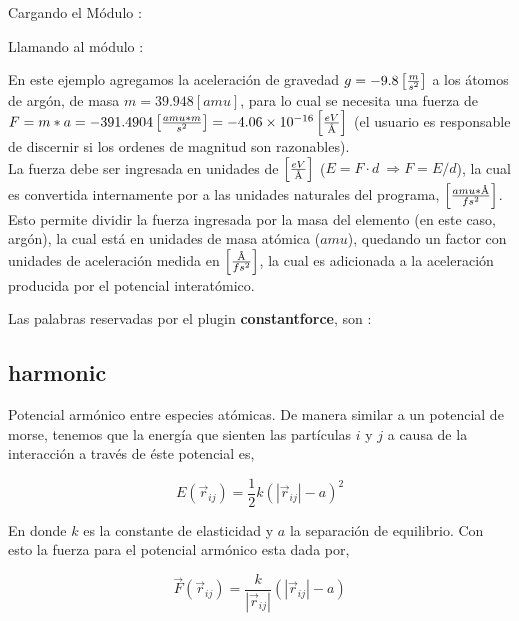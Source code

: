 Cargando el M\'odulo :

Llamando al m\'odulo :


En este ejemplo agregamos la aceleraci\'on de gravedad $g=-9.8\left[m\over s^2\right]$ a los \'atomos de arg\'on, de masa $m=39.948 [amu]$, para lo cual se necesita una fuerza de $F=m*a=-391.4904 \left[amu*m\over s^2\right]=-4.06\times10^{-16}\left[eV\over \text\AA\right]$ (el usuario es responsable de discernir si los ordenes de magnitud son razonables).\\

La fuerza debe ser ingresada en unidades de $\left[eV \over \text\AA\right]$ ($E=F\cdot d\ \Rightarrow F=E/d$), la cual es convertida internamente por {\lpmd} a las unidades naturales del programa, $\left[amu*\text\AA\over fs^2\right]$. Esto permite dividir la fuerza ingresada por la masa del elemento (en este caso, arg\'on), la cual est\'a en unidades de masa at\'omica ($amu$), quedando un factor con unidades de aceleraci\'on medida en $\left[\text\AA\over fs^2\right]$, la cual es adicionada a la aceleraci\'on producida por el potencial interat\'omico.


Las palabras reservadas por el plugin \textbf{constantforce}, son :


\subsection{harmonic}
Potencial arm\'onico entre especies at\'omicas. De manera similar a un potencial de morse, tenemos que la energ\'ia que sienten las part\'iculas $i$ y $j$ a causa de la interacci\'on a trav\'es de \'este potencial es,

$$E(\vec{r}_{ij}) = \frac{1}{2}k\left(|\vec{r}_{ij}|-a\right)^2$$

En donde $k$ es la constante de elasticidad y $a$ la separaci\'on de equilibrio. Con esto la fuerza para el potencial arm\'onico esta dada por,

$$\vec{F}(\vec{r}_{ij}) = \frac{k}{|\vec{r}_{ij}|}\left(|\vec{r}_{ij}|-a\right)$$

